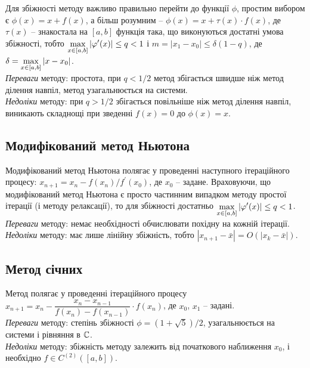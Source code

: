 Для збіжності методу важливо правильно перейти до функції $\phi$, простим вибором є $\phi(x) = x + f(x)$, а більш розумним -- $\phi(x) = x + \tau(x) \cdot f(x)$, де $\tau(x)$ -- знакостала на $[a, b]$ функція така, що виконуються достатні умова збіжності, тобто $\displaystyle\max\limits_{x\in[a,b]} |\varphi^\prime(x)| \le q < 1$ і $m = |x_1 - x_0| \le \delta (1 - q)$, де $\delta = \displaystyle\max\limits_{x\in[a,b]}|x - x_0|$. \\

\textit{Переваги} методу: простота, при $q < 1 / 2$ метод збігається швидше ніж метод ділення навпіл, метод узагальнюється на системи.\\

\textit{Недоліки} методу: при $q > 1 / 2$ збігається повільніше ніж метод ділення навпіл, виникають складнощі при зведенні $f(x) = 0$ до $\phi(x) = x$.

\subsection{Модифікований метод Ньютона}
Модифікований метод Ньютона полягає у проведенні наступного ітераційного процесу: $x_{n+1} = x_n - f(x_n) / f^\prime(x_0)$, де $x_0$ -- задане. Враховуючи, що модифікований метод Ньютона є просто частинним випадком методу простої ітерації (і методу релаксації), то для збіжності достатньо $\displaystyle\max\limits_{x\in[a,b]} |\varphi^\prime(x)| \le q < 1$.\\

\textit{Переваги} методу: немає необхідності обчислювати похідну на кожній ітерації.\\

\textit{Недоліки} методу: має лише лінійну збіжність, тобто $|x_{n+1} - \bar x| = O(|x_k - \bar x|)$.

\subsection{Метод січних}

Метод полягає у проведенні ітераційного процесу $x_{n+1} = x_n - \dfrac{x_n - x_{n-1}}{f(x_n) - f(x_{n-1})} \cdot f(x_n)$, де $x_0$, $x_1$ -- задані.\\

\textit{Переваги} методу: степінь збіжності $\phi = \left(1 + \sqrt 5\right) /2$, узагальнюється на системи і рівняння в $\mathbb{C}$.\\

\textit{Недоліки} методу: збіжність методу залежить від початкового наближення $x_0$, і необхідно $f\in C^{(2)}([a,b])$.


